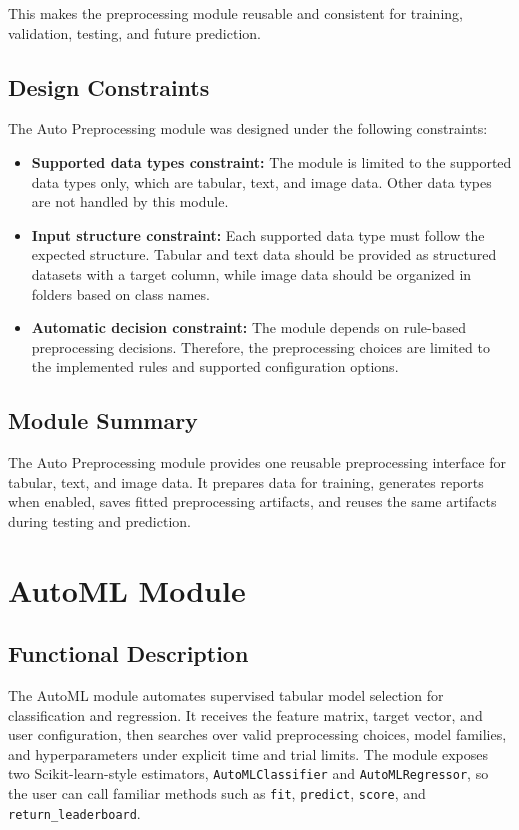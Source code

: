 \documentclass[12pt,a4paper]{report}
\begin{document}
This makes the preprocessing module reusable and consistent for training,
validation, testing, and future prediction.
\subsection{Design Constraints}

The Auto Preprocessing module was designed under the following constraints:

\begin{itemize}
  \item \textbf{Supported data types constraint:} The module is limited to the
  supported data types only, which are tabular, text, and image data. Other data
  types are not handled by this module.

  \item \textbf{Input structure constraint:} Each supported data type must follow
  the expected structure. Tabular and text data should be provided as structured
  datasets with a target column, while image data should be organized in folders
  based on class names.

  \item \textbf{Automatic decision constraint:} The module depends on rule-based
  preprocessing decisions. Therefore, the preprocessing choices are limited to
  the implemented rules and supported configuration options.
\end{itemize}

\subsection{Module Summary}
\noindent The Auto Preprocessing module provides one reusable preprocessing
interface for tabular, text, and image data. It prepares data for training,
generates reports when enabled, saves fitted preprocessing artifacts, and reuses
the same artifacts during testing and prediction.


\section{AutoML Module}
\subsection{Functional Description}
\noindent The AutoML module automates supervised tabular model selection for
classification and regression. It receives the feature matrix, target vector,
and user configuration, then searches over valid preprocessing choices, model
families, and hyperparameters under explicit time and trial limits. The module
exposes two Scikit-learn-style estimators, \texttt{AutoMLClassifier} and
\texttt{AutoMLRegressor}, so the user can call familiar methods such as
\texttt{fit}, \texttt{predict}, \texttt{score}, and
\texttt{return\_leaderboard}.
\end{document}
